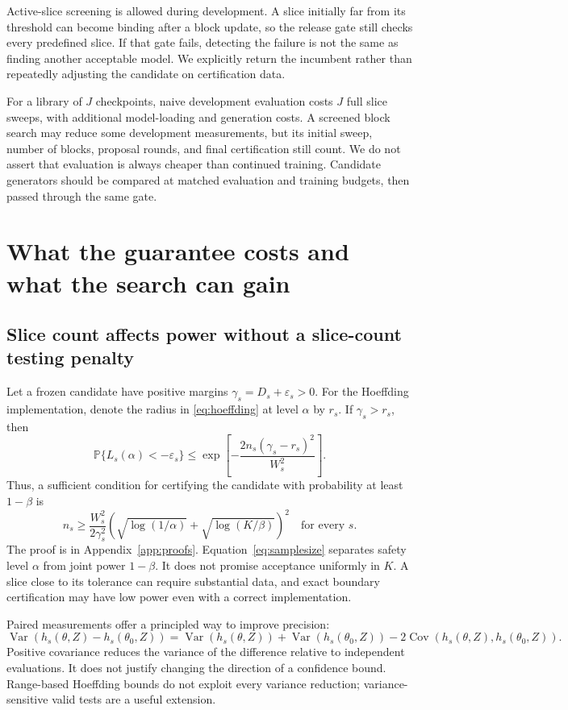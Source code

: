 \documentclass[11pt,letterpaper]{article}
\newcommand{\Prb}{\mathbb{P}}
\newcommand{\old}{\theta_0}
\newcommand{\eps}{\varepsilon}
\begin{document}
Active-slice screening is allowed during development. A slice initially far from its threshold can become binding after a block update, so the release gate still checks every predefined slice. If that gate fails, detecting the failure is not the same as finding another acceptable model. We explicitly return the incumbent rather than repeatedly adjusting the candidate on certification data.

For a library of $J$ checkpoints, naive development evaluation costs $J$ full slice sweeps, with additional model-loading and generation costs. A screened block search may reduce some development measurements, but its initial sweep, number of blocks, proposal rounds, and final certification still count. We do not assert that evaluation is always cheaper than continued training. Candidate generators should be compared at matched evaluation and training budgets, then passed through the same gate.

\section{What the guarantee costs and what the search can gain}
\label{sec:geometry}
\subsection{Slice count affects power without a slice-count testing penalty}
Let a frozen candidate have positive margins $\gamma_s=D_s+\eps_s>0$. For the Hoeffding implementation, denote the radius in \eqref{eq:hoeffding} at level $\alpha$ by $r_s$. If $\gamma_s>r_s$, then
\begin{equation}
\Prb\{L_s(\alpha)<-\eps_s\}\leq
\exp\left[-\frac{2n_s(\gamma_s-r_s)^2}{W_s^2}\right].
\label{eq:power}
\end{equation}
Thus, a sufficient condition for certifying the candidate with probability at least $1-\beta$ is
\begin{equation}
n_s\geq\frac{W_s^2}{2\gamma_s^2}
\left(\sqrt{\log(1/\alpha)}+\sqrt{\log(K/\beta)}\right)^2
\quad\text{for every }s.
\label{eq:samplesize}
\end{equation}
The proof is in Appendix~\ref{app:proofs}. Equation~\eqref{eq:samplesize} separates safety level $\alpha$ from joint power $1-\beta$. It does not promise acceptance uniformly in $K$. A slice close to its tolerance can require substantial data, and exact boundary certification may have low power even with a correct implementation.

Paired measurements offer a principled way to improve precision:
\begin{equation}
\operatorname{Var}(h_s(\theta,Z)-h_s(\old,Z))=
\operatorname{Var}(h_s(\theta,Z))+\operatorname{Var}(h_s(\old,Z))
-2\operatorname{Cov}(h_s(\theta,Z),h_s(\old,Z)).
\end{equation}
Positive covariance reduces the variance of the difference relative to independent evaluations. It does not justify changing the direction of a confidence bound. Range-based Hoeffding bounds do not exploit every variance reduction; variance-sensitive valid tests are a useful extension.
\end{document}
